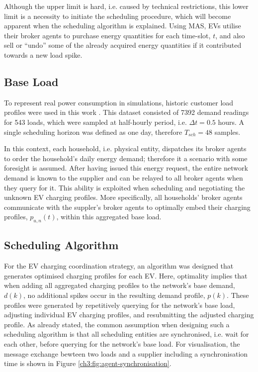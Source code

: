 

Although the upper limit is hard, i.e. caused by technical restrictions, this lower limit is a necessity to initiate the scheduling procedure, which will become apparent when the scheduling algorithm is explained.
Using MAS, EVs utilise their broker agents to purchase energy quantities for each time-slot, $t$, and also sell or ``undo'' some of the already acquired energy quantities if it contributed towards a new load spike.

\subsection{Base Load}

To represent real power consumption in simulations, historic customer load profiles were used in this work \cite{IrishData2002}.
This dataset consisted of 7392 demand readings for 543 loads, which were sampled at half-hourly period, i.e. $\Delta t = 0.5$ hours.
A single scheduling horizon was defined as one day, therefore $T_{sch}=48$ samples.

In this context, each household, i.e. physical entity, dispatches its broker agents to order the household's daily energy demand; therefore it a scenario with some foresight is assumed.
After having issued this energy request, the entire network demand is known to the supplier and can be relayed to all broker agents when they query for it.
This ability is exploited when scheduling and negotiating the unknown EV charging profiles.
More specifically, all households' broker agents communicate with the suppler's broker agents to optimally embed their charging profiles, $p_{u,n}(t)$, within this aggregated base load.

\subsection{Scheduling Algorithm}

For the EV charging coordination strategy, an algorithm was designed that generates optimised charging profiles for each EV.
Here, optimality implies that when adding all aggregated charging profiles to the network's base demand, $d(k)$, no additional spikes occur in the resulting demand profile, $p(k)$.
These profiles were generated by repetitively querying for the network's base load, adjusting individual EV charging profiles, and resubmitting the adjusted charging profile.
As already stated, the common assumption when designing such a scheduling algorithm is that all scheduling entities are synchronised, i.e. wait for each other, before querying for the network's base load.
For visualisation, the message exchange bewteen two loads and a supplier including a synchronisation time is shown in Figure \ref{ch3:fig:agent-synchronisation}.

